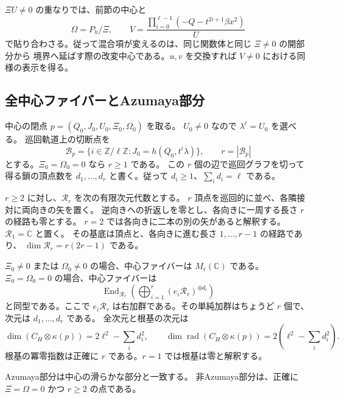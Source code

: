 $\Xi U\ne0$ の重なりでは、前節の中心と
\[
 \Omega=P_h/\Xi,\qquad
 V=\frac{\prod_{i=0}^{\ell-1}(-Q-t^{2i+1}\beta x^2)}{U}
\]
で貼り合わさる。従って混合項が変えるのは、同じ関数体と同じ $\Xi\ne0$ の開部分から
境界へ延ばす際の改変中心である。$u,v$ を交換すれば $V\ne0$ における同様の表示を得る。

\subsection{全中心ファイバーとAzumaya部分}

中心の閉点 $p=(Q_0,J_0,U_0,\Xi_0,\Omega_0)$ を取る。
$U_0\ne0$ なので $\lambda^\ell=U_0$ を選べる。
巡回軌道上の切断点を
\begin{equation}\label{eq:boundary-cuts-v39}
 \mathcal B_p=\{i\in\mathbb Z/\ell\mathbb Z:
 J_0=h(Q_0,t^i\lambda)\},\qquad r=|\mathcal B_p|
\end{equation}
とする。$\Xi_0=\Omega_0=0$ なら $r\ge1$ である。
この $r$ 個の辺で巡回グラフを切って得る鎖の頂点数を
$d_1,\ldots,d_r$ と書く。従って $d_i\ge1$、$\sum_i d_i=\ell$ である。

$r\ge2$ に対し、$\mathcal R_r$ を次の有限次元代数とする。
$r$ 頂点を巡回的に並べ、各隣接対に両向きの矢を置く。
逆向きへの折返しを零とし、各向きに一周する長さ $r$ の経路も零とする。
$r=2$ では各向きに二本の別の矢があると解釈する。
$\mathcal R_1=\mathbb C$ と置く。
その基底は頂点と、各向きに進む長さ $1,\ldots,r-1$ の経路であり、
$\dim\mathcal R_r=r(2r-1)$ である。

\begin{theorem}[切断間隔による全ファイバー分類]
\label{thm:boundary-fibers-v39}
$\Xi_0\ne0$ または $\Omega_0\ne0$ の場合、中心ファイバーは $M_\ell(\mathbb C)$ である。
$\Xi_0=\Omega_0=0$ の場合、中心ファイバーは
\begin{equation}\label{eq:boundary-inflation-v39}
 \operatorname{End}_{\mathcal R_r}
 \left(\bigoplus_{i=1}^r(e_i\mathcal R_r)^{\oplus d_i}\right)
\end{equation}
と同型である。ここで $e_i\mathcal R_r$ は右加群である。その単純加群はちょうど $r$ 個で、次元は $d_1,\ldots,d_r$ である。
全次元と根基の次元は
\[
 \dim(C_H\otimes\kappa(p))=2\ell^2-\sum_i d_i^2,\qquad
 \dim\operatorname{rad}(C_H\otimes\kappa(p))
 =2\left(\ell^2-\sum_i d_i^2\right).
\]
根基の冪零指数は正確に $r$ である。$r=1$ では根基は零と解釈する。

Azumaya部分は中心の滑らかな部分と一致する。
非Azumaya部分は、正確に $\Xi=\Omega=0$ かつ $r\ge2$ の点である。
\end{theorem}

